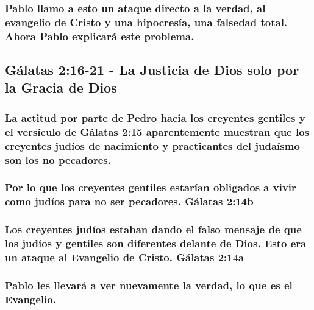 \documentclass[11a pt,twoside]{article}
\let\oldsubsection\subsection
\renewcommand{\subsection}{\needspace{5\baselineskip}\oldsubsection}
\let\oldsubsubsection\subsubsection
\renewcommand{\subsubsection}{\needspace{4\baselineskip}\oldsubsubsection}
\begin{document}
\subsubsection{Pablo llamo a esto un ataque directo a la verdad, al
evangelio de Cristo y una hipocresía, una falsedad total. Ahora Pablo
explicará este
problema.}\label{pablo-llamo-a-esto-un-ataque-directo-a-la-verdad-al-evangelio-de-cristo-y-una-hipocresuxeda-una-falsedad-total.-ahora-pablo-explicaruxe1-este-problema.}

\subsection{Gálatas 2:16-21 - La Justicia de Dios solo por la Gracia de
Dios}\label{guxe1latas-216-21---la-justicia-de-dios-solo-por-la-gracia-de-dios}

\subsubsection{La actitud por parte de Pedro hacia los creyentes
gentiles y el versículo de Gálatas 2:15 aparentemente muestran que los
creyentes judíos de nacimiento y practicantes del judaísmo son los no
pecadores.}\label{la-actitud-por-parte-de-pedro-hacia-los-creyentes-gentiles-y-el-versuxedculo-de-guxe1latas-215-aparentemente-muestran-que-los-creyentes-juduxedos-de-nacimiento-y-practicantes-del-judauxedsmo-son-los-no-pecadores.}

\subsubsection{Por lo que los creyentes gentiles estarían obligados a
vivir como judíos para no ser pecadores. Gálatas
2:14b}\label{por-lo-que-los-creyentes-gentiles-estaruxedan-obligados-a-vivir-como-juduxedos-para-no-ser-pecadores.-guxe1latas-214b}

\subsubsection{Los creyentes judíos estaban dando el falso mensaje de
que los judíos y gentiles son diferentes delante de Dios. Esto era un
ataque al Evangelio de Cristo. Gálatas
2:14a}\label{los-creyentes-juduxedos-estaban-dando-el-falso-mensaje-de-que-los-juduxedos-y-gentiles-son-diferentes-delante-de-dios.-esto-era-un-ataque-al-evangelio-de-cristo.-guxe1latas-214a}

\subsubsection{Pablo les llevará a ver nuevamente la verdad, lo que es
el
Evangelio.}\label{pablo-les-llevaruxe1-a-ver-nuevamente-la-verdad-lo-que-es-el-evangelio.}
\end{document}
